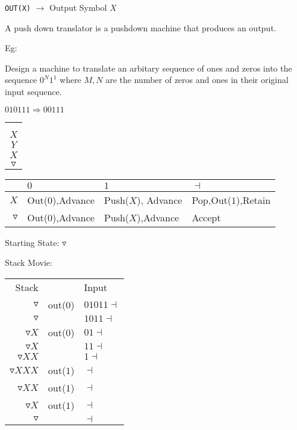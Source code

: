 \documentclass[a4paper,12pt]{article}
\begin{document}
\verb!OUT(X)! $\to$	Output Symbol $X$

A push down translator is a pushdown machine that produces an output.

Eg:

Design a machine to translate an arbitary sequence of ones and zeros
into the sequence $0^{N}1^{1}$ where $M, N$ are the number of zeros and
ones in their original input sequence.

$010111 \Rightarrow 00111$

\begin{tabular}{|c|}
		\\
\hspace{20mm}	\\
		\\
\hline
$X$	\\
\hline
$Y$	\\
\hline
$X$	\\
\hline
$\triangledown$	\\
\hline
\end{tabular}


\begin{tabular}{r|l|l|l|}
\hline
		&		$0$		&			$1$			&	$\dashv$				\\
\hline
$X$	& Out($0$),Advance	&	Push($X$), Advance 		& Pop,Out($1$),Retain \\
\hline
$\triangledown$	&	Out($0$),Advance		& Push($X$),Advance	& Accept	\\
\hline
\end{tabular}

Starting State: $\triangledown$


Stack Movie:

\begin{tabular}{rcl}
Stack								&				&	Input				\\
$\triangledown$			& out($0$)	&	$01011\dashv$	\\	
$\triangledown$			&				&	$1011\dashv$	\\	
$\triangledown X$			& out($0$)	&	$01\dashv$		\\	
$\triangledown X$			&				&	$11\dashv$		\\	
$\triangledown X X$		&				&	$1\dashv$		\\	
$\triangledown X X X$	& out($1$)	&	$\dashv$			\\	
$\triangledown X X$		& out($1$)	&	$\dashv$			\\	
$\triangledown X$			& out($1$)	&	$\dashv$			\\	
$\triangledown$			&				&	$\dashv$			\\	
\end{tabular}
\end{document}
